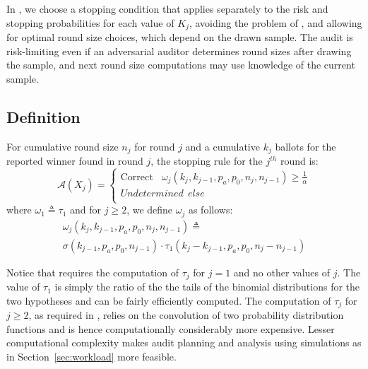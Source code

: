 In \Providence, we choose a stopping condition that applies separately to the risk and stopping probabilities for each value of $K_j$, avoiding the problem of \Minerva, and allowing for optimal round size choices, which depend on the drawn sample. 
The \Providence audit is risk-limiting even if an adversarial auditor determines round sizes after drawing the sample, and next round size computations may use knowledge of the current sample. 

\subsection{Definition}
\label{sec:prov_def}
\begin{definition}
    \label{def:minervatwo}
    For cumulative round size $n_j$ for round $j$ and a cumulative $k_j$ ballots for the reported winner found in round $j$, the \R \Providence stopping rule for the $j^{th}$ round is:
$$
\mathcal{A}(X_{j})=  \left\{ \begin{array}{ll} \text{Correct} ~~~~ \omega_{j}(k_{j}, k_{j-1}, p_a, p_0, n_j, n_{j-1}) \geq \frac{1}{\alpha}\\
        Undetermined ~~else \\
    \end{array}
    \right .
$$
where $\omega _{1}\triangleq \tau_{1}$ and for $j\ge 2$, we define $\omega _{j}$ as follows:
\begin{equation}
    \begin{aligned}
    \omega_{j}(k_{j}, k_{j-1}, p_a, p_0, n_{j}, n_{j-1})
    \triangleq\\
    \sigma(k_{j-1},p_a,p_0,n_{j-1})\cdot \tau_1(k_{j}-k_{j-1},p_a,p_0,n_j-n_{j-1})
    \end{aligned}
\end{equation}
\end{definition}

Notice that \Providence requires the computation of $\tau_j$ for $j=1$ and no other values of $j$. The value of $\tau_1$ is simply the ratio of the the tails of the binomial distributions for the two hypotheses and can be fairly efficiently computed. The computation of $\tau_j$ for $j \geq 2$, as required in \Minerva, relies on the convolution of two probability distribution functions and is hence computationally considerably more expensive. Lesser computational complexity makes audit planning and analysis using simulations as in Section~\ref{sec:workload} more feasible.

